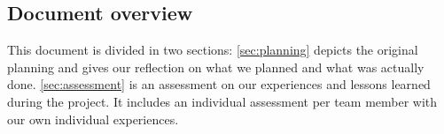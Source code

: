 
\subsection{Document overview}
This document is divided in two sections:
\autoref{sec:planning} depicts the original planning and gives our reflection on what we planned and what was actually done.
\autoref{sec:assessment} is an assessment on our experiences and lessons learned during the project.
It includes an individual assessment per team member with our own individual experiences.